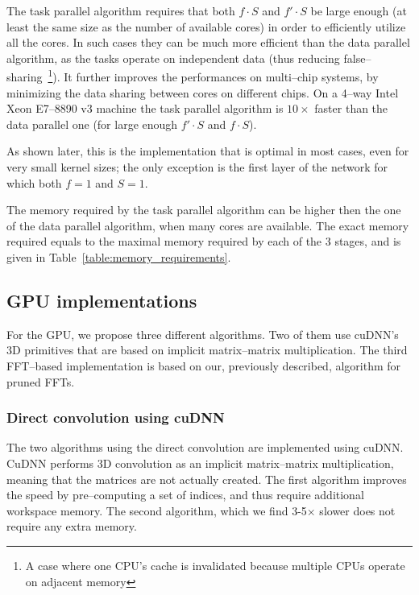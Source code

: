 \documentclass[conference]{./IEEEtran/IEEEtran}
\begin{document}
  The task parallel algorithm requires that both $f \cdot S$ and $f'
  \cdot S$ be large enough (at least the same size as the number of
  available cores) in order to efficiently utilize all the cores.  In
  such cases they can be much more efficient than the data parallel
  algorithm, as the tasks operate on independent data (thus reducing
  false--sharing~\footnote{A case where one CPU's cache is invalidated
    because multiple CPUs operate on adjacent memory}).  It further
  improves the performances on multi--chip systems, by minimizing the
  data sharing between cores on different chips. On a 4--way Intel
  Xeon E7--8890 v3 machine the task parallel algorithm is $10 \times$
  faster than the data parallel one (for large enough $f' \cdot S$ and
  $f \cdot S$).

  As shown later, this is the implementation that is optimal in most
  cases, even for very small kernel sizes; the only exception is the
  first layer of the network for which both $f = 1$ and $S = 1$.

  The memory required by the task parallel algorithm can be higher
  then the one of the data parallel algorithm, when many cores are
  available.  The exact memory required equals to the maximal memory
  required by each of the 3 stages, and is given in
  Table~\ref{table:memory_requirements}.


\subsection{GPU implementations}

  For the GPU, we propose three different algorithms.  Two of them use
  cuDNN's 3D primitives that are based on implicit matrix--matrix
  multiplication.  The third FFT--based implementation is based on
  our, previously described, algorithm for pruned FFTs.

\subsubsection{Direct convolution using cuDNN}

  The two algorithms using the direct convolution are implemented
  using cuDNN.  CuDNN performs 3D convolution as an implicit
  matrix--matrix multiplication, meaning that the matrices are not
  actually created.  The first algorithm improves the speed by
  pre--computing a set of indices, and thus require additional
  workspace memory.  The second algorithm, which we find 3-5$\times$
  slower does not require any extra memory.
\end{document}
